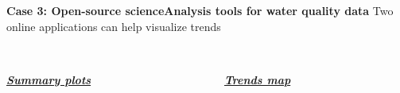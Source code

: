 \documentclass[serif]{beamer}\usepackage[]{graphicx}\usepackage[]{color}
\newcommand{\emtxt}[1]{\textbf{\textit{#1}}}
\begin{document}
\begin{frame}{\textbf{Case 3: Open-source science}}{\textbf{Analysis tools for water quality data}}
Two online applications can help visualize trends \\~\\
\begin{columns}[t]
\begin{column}{0.45\textwidth}
\centerline{\emtxt{\href{https://beckmw.shinyapps.io/swmp_summary}{Summary plots}}}
\centerline{}
\end{column}
\begin{column}{0.45\textwidth}
\centerline{\emtxt{\href{https://beckmw.shinyapps.io/swmp_comp}{Trends map}}}
\centerline{}
\end{column}
\end{columns}
\end{frame}
\end{document}
